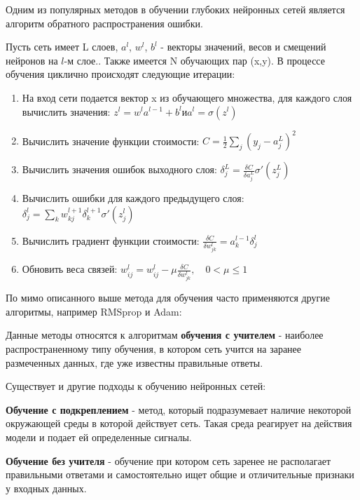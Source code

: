  

Одним из популярных методов в обучении глубоких нейронных сетей является алгоритм обратного распространения ошибки. 

Пусть сеть имеет L слоев, $a^l$, $w_{}^l$, $b^l$ - векторы значений, весов и смещений нейронов на $l$-м слое.. Также имеется N обучающих пар (x,y). 
В процессе обучения циклично происходят следующие итерации: 

\begin{enumerate}
    \item На вход сети подается вектор x из обучающего множества, для каждого слоя вычислить значения: \hfill $z^l = w^la^{l-1}+b^l и a^l = \sigma(z^l)$
    \item Вычислить значение функции стоимости: \hfill $C = \frac{1}{2}\sum_j{(y_j-a_j^L)^2}$
    \item Вычислить значения ошибок выходного слоя: \hfill $\delta_j^L=\frac{\delta C}{\delta a_j^L}\sigma'(z_j^L)$
    \item Вычислить ошибки для каждого предыдущего слоя: \hfill $\delta_j^l=\sum_k{w_{kj}^{l+1} \delta_k^{l+1}\sigma'(z_j^l)}$
    \item Вычислить градиент функции стоимости: \hfill $\frac{\delta C}{\delta w_{jk}^l} = a_k^{l-1} \delta_j^l$ %
    \item Обновить веса связей: \hfill $w_{ij}^l=w_{ij}^l-\mu\frac{\delta C}{\delta w_{jk}^l},\hspace{1em} 0<\mu \leqslant 1$
\end{enumerate}
\vspace{1em}
По мимо описанного выше метода для обучения часто применяются другие алгоритмы, например RMSprop и Adam:



\vspace{1em}
Данные методы относятся к алгоритмам \textbf{обучения с учителем} - наиболее распространенному типу обучения, в котором сеть учится на заранее размеченных данных, где уже известны правильные ответы.

Существует и другие подходы к обучению нейронных сетей:

\textbf{Обучение с подкреплением} - метод, который подразумевает наличие некоторой окружающей среды в которой действует сеть. Такая среда реагирует на действия модели и подает ей определенные сигналы.  

\textbf{Обучение без учителя} - обучение при котором сеть заренее не располагает правильными ответами и самостоятельно ищет общие и отличительные признаки у входных данных. 

